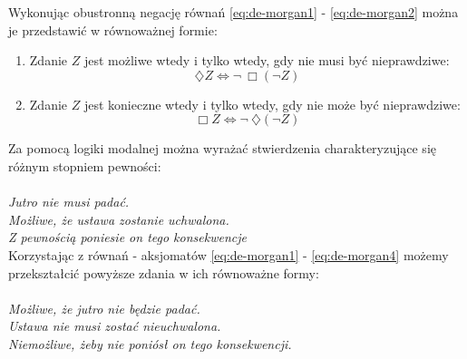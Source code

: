 \documentclass{article}
\begin{document}
Wykonując obustronną negację równań \ref{eq:de-morgan1} - \ref{eq:de-morgan2} można je przedstawić w równoważnej formie: 

\begin{enumerate}
	\item Zdanie $Z$ jest możliwe wtedy i tylko wtedy, gdy nie musi być nieprawdziwe:
	\begin{equation} \label{eq:de-morgan3}
	\diamondsuit Z \Leftrightarrow \neg \ \Box \left( \neg Z \right)
	\end{equation}
	\item Zdanie $Z$ jest konieczne wtedy i tylko wtedy, gdy nie może być nieprawdziwe:
	\begin{equation} \label{eq:de-morgan4}
	\Box Z \Leftrightarrow \neg \ \diamondsuit \left( \neg Z \right)
	\end{equation}
\end{enumerate}

Za pomocą logiki modalnej można wyrażać stwierdzenia charakteryzujące się różnym stopniem pewności: \\ \\ 
\emph{Jutro nie musi padać. } \\ 
\emph{Możliwe, że ustawa zostanie uchwalona. } \\ 
\emph{Z pewnością poniesie on tego konsekwencje} \\ 

Korzystając z równań - aksjomatów \ref{eq:de-morgan1} - \ref{eq:de-morgan4} możemy przekształcić powyższe zdania w ich równoważne formy: \\ \\ 
\emph{Możliwe, że jutro nie będzie padać. } \\ 
\emph{Ustawa nie musi zostać nieuchwalona. } \\ 
\emph{Niemożliwe, żeby nie poniósł on tego konsekwencji. } \\ 
\end{document}
